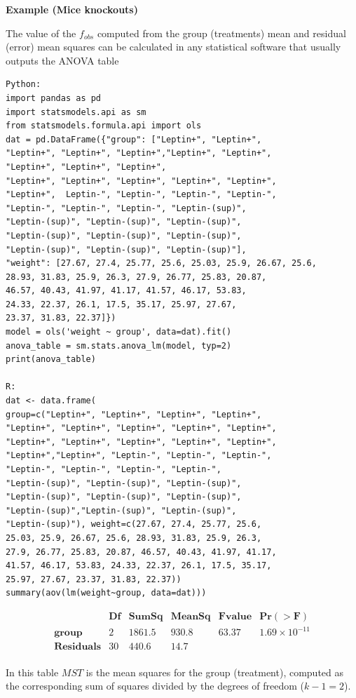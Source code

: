 \documentclass[
]{book}
\begin{document}
\textbf{Example (Mice knockouts)}

The value of the \(f_{obs}\) computed from the group (treatments) mean and residual (error) mean squares can be calculated in any statistical software that usually outputs the ANOVA table

\begin{verbatim}
Python:
import pandas as pd
import statsmodels.api as sm
from statsmodels.formula.api import ols
dat = pd.DataFrame({"group": ["Leptin+", "Leptin+",
"Leptin+", "Leptin+", "Leptin+","Leptin+", "Leptin+",
"Leptin+", "Leptin+", "Leptin+",
"Leptin+", "Leptin+", "Leptin+", "Leptin+", "Leptin+",
"Leptin+",  Leptin-", "Leptin-", "Leptin-", "Leptin-",
"Leptin-", "Leptin-", "Leptin-", "Leptin-(sup)",
"Leptin-(sup)", "Leptin-(sup)", "Leptin-(sup)",
"Leptin-(sup)", "Leptin-(sup)", "Leptin-(sup)",
"Leptin-(sup)", "Leptin-(sup)", "Leptin-(sup)"],
"weight": [27.67, 27.4, 25.77, 25.6, 25.03, 25.9, 26.67, 25.6, 
28.93, 31.83, 25.9, 26.3, 27.9, 26.77, 25.83, 20.87,
46.57, 40.43, 41.97, 41.17, 41.57, 46.17, 53.83, 
24.33, 22.37, 26.1, 17.5, 35.17, 25.97, 27.67,
23.37, 31.83, 22.37]})
model = ols('weight ~ group', data=dat).fit()
anova_table = sm.stats.anova_lm(model, typ=2)
print(anova_table)

R:
dat <- data.frame(
group=c("Leptin+", "Leptin+", "Leptin+", "Leptin+",
"Leptin+", "Leptin+", "Leptin+", "Leptin+", "Leptin+",
"Leptin+", "Leptin+", "Leptin+", "Leptin+", "Leptin+",
"Leptin+","Leptin+", "Leptin-", "Leptin-", "Leptin-",
"Leptin-", "Leptin-", "Leptin-", "Leptin-",
"Leptin-(sup)", "Leptin-(sup)", "Leptin-(sup)",
"Leptin-(sup)", "Leptin-(sup)", "Leptin-(sup)",
"Leptin-(sup)","Leptin-(sup)", "Leptin-(sup)",
"Leptin-(sup)"), weight=c(27.67, 27.4, 25.77, 25.6,
25.03, 25.9, 26.67, 25.6, 28.93, 31.83, 25.9, 26.3,
27.9, 26.77, 25.83, 20.87, 46.57, 40.43, 41.97, 41.17,
41.57, 46.17, 53.83, 24.33, 22.37, 26.1, 17.5, 35.17,
25.97, 27.67, 23.37, 31.83, 22.37))
summary(aov(lm(weight~group, data=dat)))
\end{verbatim}

\[
\begin{array}{cccccc}
&\mathbf{Df} & \mathbf{Sum Sq} & \mathbf{Mean Sq} & \mathbf{F value} & \mathbf{Pr(>F)} \\ 
\mathbf{group}    &    2 &1861.5&   930.8 & 63.37 &1.69\times10^{-11}\\
\mathbf{Residuals}&   30  &440.6&    14.7 &  & \\  
\end{array}
\]

In this table \(MST\) is the mean squares for the group (treatment), computed as the corresponding sum of squares divided by the degrees of freedom (\(k-1=2\)).
\end{document}

